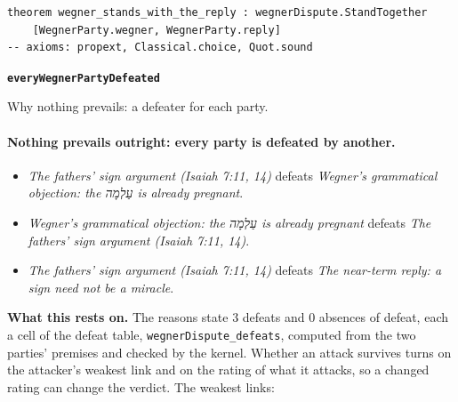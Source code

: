 \documentclass[11pt]{article}
\begin{document}
{\small\begin{verbatim}
theorem wegner_stands_with_the_reply : wegnerDispute.StandTogether
    [WegnerParty.wegner, WegnerParty.reply]
-- axioms: propext, Classical.choice, Quot.sound
\end{verbatim}}
\par\medskip\noindent\textbf{\texttt{every\allowbreak{}Wegner\allowbreak{}Party\allowbreak{}Defeated}}\par\nobreak\noindent
Why nothing prevails: a defeater for each party.

\paragraph{Nothing prevails outright: every party is defeated by another.}
\begin{itemize}
\item \emph{The fathers’ sign argument (Isaiah 7:11, 14)} defeats \emph{Wegner’s grammatical objection: the עַלְמָה is already pregnant}.
\item \emph{Wegner’s grammatical objection: the עַלְמָה is already pregnant} defeats \emph{The fathers’ sign argument (Isaiah 7:11, 14)}.
\item \emph{The fathers’ sign argument (Isaiah 7:11, 14)} defeats \emph{The near-term reply: a sign need not be a miracle}.
\end{itemize}
\par\noindent\textbf{What this rests on.} The reasons state 3 defeats and 0 absences of defeat, each a cell of the defeat table, \texttt{wegner\allowbreak{}Dispute\_\allowbreak{}defeats}, computed from the two parties' premises and checked by the kernel. Whether an attack survives turns on the attacker's weakest link and on the rating of what it attacks, so a changed rating can change the verdict. The weakest links:
\end{document}

